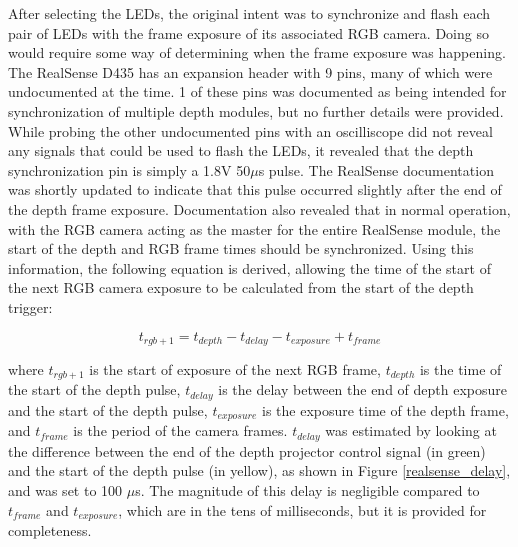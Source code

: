 After selecting the LEDs, the original intent was to synchronize and flash each pair of LEDs with the frame exposure of its associated RGB camera. Doing so would require some way of determining when the frame exposure was happening. The RealSense D435 has an expansion header with 9 pins, many of which were undocumented at the time. 1 of these pins was documented as being intended for synchronization of multiple depth modules, but no further details were provided. While probing the other undocumented pins with an oscilliscope did not reveal any signals that could be used to flash the LEDs, it revealed that the depth synchronization pin is simply a 1.8V 50$\mu$s pulse. The RealSense documentation was shortly updated to indicate that this pulse occurred slightly after the end of the depth frame exposure. Documentation also revealed that in normal operation, with the RGB camera acting as the master for the entire RealSense module, the start of the depth and RGB frame times should be synchronized. Using this information, the following equation is derived, allowing the time of the start of the next RGB camera exposure to be calculated from the start of the depth trigger:
	
\begin{equation} \label{led_flashing_eq}
	t_{rgb+1} = t_{depth} - t_{delay} - t_{exposure} + t_{frame}
\end{equation}

where $t_{rgb+1}$ is the start of exposure of the next RGB frame, $t_{depth}$ is the time of the start of the depth pulse, $t_{delay}$ is the delay between the end of depth exposure and the start of the depth pulse, $t_{exposure}$ is the exposure time of the depth frame, and $t_{frame}$ is the period of the camera frames. $t_{delay}$ was estimated by looking at the difference between the end of the depth projector control signal (in green) and the start of the depth pulse (in yellow), as shown in Figure \ref{realsense_delay}, and was set to 100 $\mu$s. The magnitude of this delay is negligible compared to $t_{frame}$ and $t_{exposure}$, which are in the tens of milliseconds, but it is provided for completeness.

